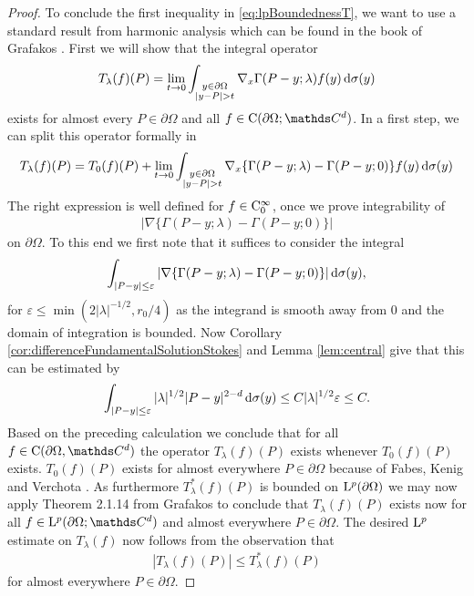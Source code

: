\begin{proof}
   To conclude the first inequality in \eqref{eq:lpBoundednessT}, we want to use a standard result from harmonic analysis which can be found in the book of Grafakos \cite[1.1.14]{grafakos2014classical}.
   First we will show that the integral operator
   \begin{align*}
     T_\lambda(f)(P) = \lim_{t \to 0} \int_{\substack{y \in \partial\Omega \\ |y - P| > t}} \nabla_x \Gamma(P - y; \lambda) f(y) \, {\operatorname{d}\!{\sigma}}(y)
   \end{align*}
   exists for almost every $P \in \partial\Omega$ and all $f \in \CC(\partial\Omega; \C^d)$.
   In a first step, we can split this operator formally in
   \begin{align*}
     T_\lambda(f)(P) = T_0(f)(P) + \lim_{t \to 0} \int_{\substack{y \in \partial\Omega \\ |y - P| > t}} \nabla_x \{ \Gamma(P - y; \lambda) - \Gamma(P - y; 0)\}  f(y) \, {\operatorname{d}\!{\sigma}}(y)
   \end{align*}
   The right expression is well defined for $f \in \mathrm{C}_0^\infty$, once we prove integrability of 
   \begin{align*}
     |\nabla \{\Gamma(P - y; \lambda) - \Gamma(P - y; 0)\} |
   \end{align*}
   on $\partial\Omega$.
   To this end we first note that it suffices to consider the integral
   \begin{align*}
     \int_{|P - y| \leq \varepsilon} | \nabla\{ \Gamma(P - y; \lambda) - \Gamma(P - y; 0) \} | \, {\operatorname{d}\!{\sigma}}(y), 
   \end{align*}
   for $\varepsilon \leq \min(2|\lambda|^{-1/2}, r_0/4)$ as the integrand is smooth away from $0$ and the domain of integration is bounded.
   Now Corollary \ref{cor:differenceFundamentalSolutionStokes} and Lemma \ref{lem:central} give that this can be estimated by
   \begin{align*}
     \int_{|P - y| \leq \varepsilon} |\lambda|^{1/2} |P - y|^{2 - d} \, {\operatorname{d}\!{\sigma}}(y) \leq C |\lambda|^{1/2} \varepsilon \leq C.
   \end{align*}
   Based on the preceding calculation we conclude that for all $f \in \CC(\partial\Omega,\C^d)$ the operator $T_\lambda(f)(P)$ exists whenever $T_0(f)(P)$ exists.
   $T_0(f)(P)$ exists for almost everywhere $P \in \partial\Omega$ because of Fabes, Kenig and Verchota \cite{fabesKenigVerchota}.
   As furthermore $T_\lambda^*(f)(P)$ is bounded on $\mathrm{L}^p(\partial\Omega)$  we may now apply Theorem 2.1.14 from Grafakos \cite{grafakos2014classical} to conclude that $T_\lambda(f)(P)$ exists now for all $f \in \Ell^p(\partial\Omega; \C^d)$ and almost everywhere $P \in \partial\Omega$.
   The desired $\mathrm{L}^p$ estimate on $T_\lambda(f)$ now follows from the observation that 
   \begin{align*}
     | T_\lambda(f)(P) | \leq T_\lambda^*(f)(P)
   \end{align*}
   for almost everywhere $P \in \partial\Omega$.
\end{proof}

